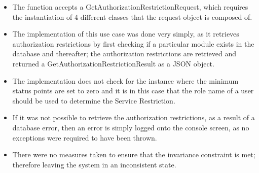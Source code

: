 \begin{itemize}
	\item The function accepts a GetAuthorizationRestrictionRequest, which requires the instantiation of 4 different classes that the request object is composed of.

	\item The implementation of this use case was done very simply, as it retrieves authorization restrictions by first checking if a particular module exists in the database and thereafter; the authorization restrictions are retrieved and returned a GetAuthorizationRestrictionResult as a JSON object.

	\item The implementation does not check for the instance where the minimum status points are set to zero and it is in this case that the role name of a user should be used to determine the Service Restriction. 

	\item If it was not possible to retrieve the authorization restrictions, as a result of a database error, then an error is simply logged onto the console screen, as no exceptions were required to have been thrown.

	\item There were no measures taken to ensure that the invariance constraint is met; therefore leaving the system in an inconsistent state.
\end{itemize}





